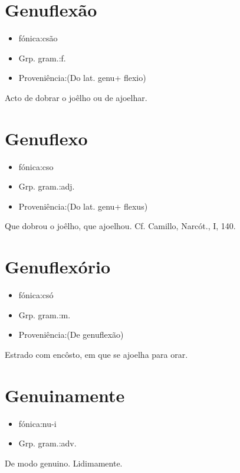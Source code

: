 \section{Genuflexão}
\begin{itemize}
\item {fónica:csão}
\end{itemize}
\begin{itemize}
\item {Grp. gram.:f.}
\end{itemize}
\begin{itemize}
\item {Proveniência:(Do lat. \textunderscore genu\textunderscore  + \textunderscore flexio\textunderscore )}
\end{itemize}
Acto de dobrar o joêlho ou de ajoelhar.
\section{Genuflexo}
\begin{itemize}
\item {fónica:cso}
\end{itemize}
\begin{itemize}
\item {Grp. gram.:adj.}
\end{itemize}
\begin{itemize}
\item {Proveniência:(Do lat. \textunderscore genu\textunderscore  + \textunderscore flexus\textunderscore )}
\end{itemize}
Que dobrou o joêlho, que ajoelhou. Cf. Camillo, \textunderscore Narcót.\textunderscore , I, 140.
\section{Genuflexório}
\begin{itemize}
\item {fónica:csó}
\end{itemize}
\begin{itemize}
\item {Grp. gram.:m.}
\end{itemize}
\begin{itemize}
\item {Proveniência:(De \textunderscore genuflexão\textunderscore )}
\end{itemize}
Estrado com encôsto, em que se ajoelha para orar.
\section{Genuinamente}
\begin{itemize}
\item {fónica:nu-i}
\end{itemize}
\begin{itemize}
\item {Grp. gram.:adv.}
\end{itemize}
De modo genuino.
Lidimamente.
